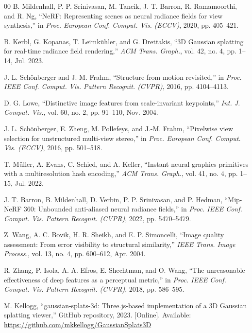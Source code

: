 \documentclass[conference]{IEEEtran}
\begin{document}
\begin{thebibliography}{00}
 B. Mildenhall, P. P. Srinivasan, M. Tancik, J. T. Barron, R. Ramamoorthi, and R. Ng, ``NeRF: Representing scenes as neural radiance fields for view synthesis,'' in \textit{Proc. European Conf. Comput. Vis. (ECCV)}, 2020, pp. 405--421.

 B. Kerbl, G. Kopanas, T. Leimk{\"u}hler, and G. Drettakis, ``3D Gaussian splatting for real-time radiance field rendering,'' \textit{ACM Trans. Graph.}, vol. 42, no. 4, pp. 1--14, Jul. 2023.

 J. L. Sch{\"o}nberger and J.-M. Frahm, ``Structure-from-motion revisited,'' in \textit{Proc. IEEE Conf. Comput. Vis. Pattern Recognit. (CVPR)}, 2016, pp. 4104--4113.

 D. G. Lowe, ``Distinctive image features from scale-invariant keypoints,'' \textit{Int. J. Comput. Vis.}, vol. 60, no. 2, pp. 91--110, Nov. 2004.

 J. L. Sch{\"o}nberger, E. Zheng, M. Pollefeys, and J.-M. Frahm, ``Pixelwise view selection for unstructured multi-view stereo,'' in \textit{Proc. European Conf. Comput. Vis. (ECCV)}, 2016, pp. 501--518.

 T. M{\"u}ller, A. Evans, C. Schied, and A. Keller, ``Instant neural graphics primitives with a multiresolution hash encoding,'' \textit{ACM Trans. Graph.}, vol. 41, no. 4, pp. 1--15, Jul. 2022.

 J. T. Barron, B. Mildenhall, D. Verbin, P. P. Srinivasan, and P. Hedman, ``Mip-NeRF 360: Unbounded anti-aliased neural radiance fields,'' in \textit{Proc. IEEE Conf. Comput. Vis. Pattern Recognit. (CVPR)}, 2022, pp. 5470--5479.

 Z. Wang, A. C. Bovik, H. R. Sheikh, and E. P. Simoncelli, ``Image quality assessment: From error visibility to structural similarity,'' \textit{IEEE Trans. Image Process.}, vol. 13, no. 4, pp. 600--612, Apr. 2004.

 R. Zhang, P. Isola, A. A. Efros, E. Shechtman, and O. Wang, ``The unreasonable effectiveness of deep features as a perceptual metric,'' in \textit{Proc. IEEE Conf. Comput. Vis. Pattern Recognit. (CVPR)}, 2018, pp. 586--595.

 M. Kellogg, ``gaussian-splats-3d: Three.js-based implementation of a 3D Gaussian splatting viewer,'' GitHub repository, 2023. [Online]. Available: \url{https://github.com/mkkellogg/GaussianSplats3D}
\end{thebibliography}
\end{document}
